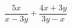 \begin{ex}[type=expressions]
	\begin{condition}
		\( \dfrac{5x}{x-3y}+\dfrac{4x+3y}{3y-x} \)
	\end{condition}
\end{ex}